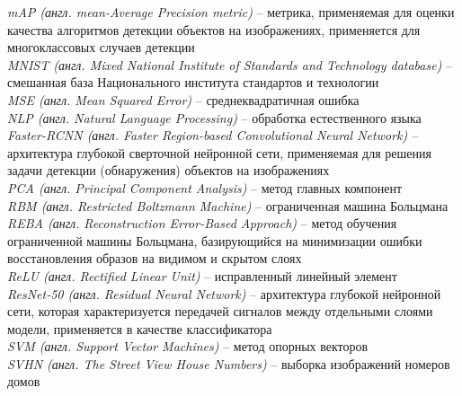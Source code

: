 \textit{mAP (англ. mean-Average Precision metric)} -- метрика, применяемая для оценки качества алгоритмов детекции объектов на изображениях, применяется для многоклассовых случаев детекции\\
\textit{MNIST (англ. Mixed National Institute of Standards and Technology database)} -- смешанная база Национального института стандартов и технологии\\
\textit{MSE (англ. Mean Squared Error)} -- среднеквадратичная ошибка\\
\textit{NLP (англ. Natural Language Processing)} -- обработка естественного языка\\
\textit{Faster-RCNN (англ. Faster Region-based Convolutional Neural Network)} -- архитектура глубокой сверточной нейронной сети, применяемая для решения задачи детекции (обнаружения) объектов на изображениях\\
\textit{PCA (англ. Principal Component Analysis)} -- метод главных компонент\\
\textit{RBM (англ. Restricted Boltzmann Machine)} -- ограниченная машина Больцмана\\
\textit{REBA (англ. Reconstruction Error-Based Approach)} -- метод обучения ограниченной машины Больцмана, базирующийся на минимизации ошибки восстановления образов на видимом и скрытом слоях\\
\textit{ReLU (англ. Rectified Linear Unit)} -- исправленный линейный элемент\\
\textit{ResNet-50 (англ. Residual Neural Network)} -- архитектура глубокой нейронной сети, которая характеризуется передачей сигналов между отдельными слоями модели, применяется в качестве классификатора\\
\textit{SVM (англ. Support Vector Machines)} -- метод опорных векторов\\
\textit{SVHN (англ. The Street View House Numbers)} -- выборка изображений номеров домов




